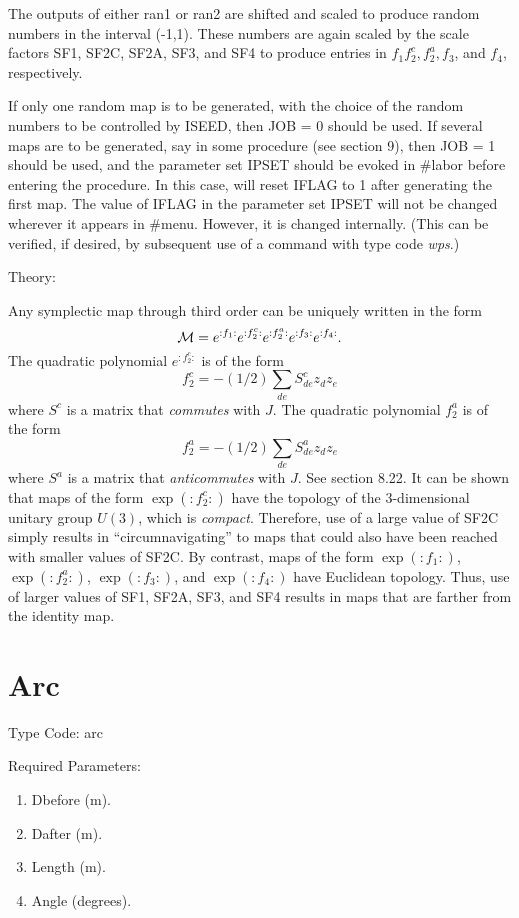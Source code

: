 The outputs of either ran1 or ran2 are shifted and scaled to produce
random numbers in the interval (-1,1).  These numbers are again scaled by
the scale factors SF1, SF2C, SF2A, SF3, and SF4 to produce entries in
$f_1 f_2^c, f_2^a, f_3$, and $f_4$, respectively.

If only one random map is to be generated, with the choice of the random
numbers to be controlled by ISEED, then JOB = 0 should be used.  If
several maps are to be generated, say in some procedure (see section 9),
then JOB = 1 should be used, and the parameter set IPSET should be evoked
in \#labor before entering the procedure.  In this case, \Mary will reset
IFLAG to 1 after generating the first map.  The value of IFLAG in the
parameter set IPSET will not be changed wherever it appears in \#menu.
However, it is changed internally.  (This can be verified, if desired, by
subsequent use of a command with type code {\em wps}.)

\vspace{5mm}
     Theory:
\vspace{2mm}

Any symplectic map through third order can be uniquely written in the form
\[
{\cal M} = e^{:f_1:}  e^{:f_2^c:} e^{:f_2^a:} e^{:f_3:} e^{:f_4:}.
\]
The quadratic polynomial $e^{:f_2^c:}$ is of the form
\[
f_2^c = -(1/2) \sum_{de} S^c_{de} z_d z_e
\]
where $S^c$ is a matrix that {\em commutes} with $J$.  The quadratic polynomial $f^a_2$ is of the form
\[
f^a_2 = -(1/2) \sum_{de} S^a_{de} z_d z_e
\]
where $S^a$ is a matrix that {\em anticommutes} with $J$.  See section 8.22.  It can be
shown that maps of the form $\exp (:f^c_2:)$ have the topology of the
3-dimensional unitary group $U(3)$, which is {\em compact}.  Therefore,
use of a large value of SF2C simply results in ``circumnavigating'' to
maps that could also have been reached with smaller values of SF2C.  By
contrast, maps of the form $\exp (:f_1:)$, $\exp (:f^a_2:)$, $\exp
(:f_3:)$, and $\exp (:f_4:)$ have Euclidean topology.  Thus, use of
larger values of SF1, SF2A, SF3, and SF4 results in maps that are farther
from the identity map.

\newpage
\section{Arc}
     Type Code: arc

\vspace{5mm}
     Required Parameters:
\begin{enumerate}
      \item  Dbefore (m).
	  \item  Dafter (m).
	  \item  Length (m).
	  \item Angle (degrees).
\end{enumerate}


